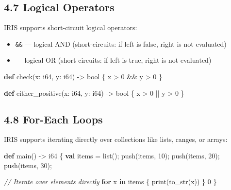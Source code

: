 \documentclass[
  english,
]{book}
\newenvironment{Shaded}{\begin{snugshade}}{\end{snugshade}}
\newcommand{\CommentTok}[1]{\textcolor[rgb]{0.42,0.60,0.33}{\textit{#1}}}
\newcommand{\ControlFlowTok}[1]{\textcolor[rgb]{0.77,0.53,0.75}{\textbf{#1}}}
\newcommand{\DataTypeTok}[1]{\textcolor[rgb]{0.31,0.79,0.69}{#1}}
\newcommand{\DecValTok}[1]{\textcolor[rgb]{0.71,0.81,0.66}{#1}}
\newcommand{\FunctionTok}[1]{\textcolor[rgb]{0.86,0.86,0.67}{#1}}
\newcommand{\KeywordTok}[1]{\textcolor[rgb]{0.34,0.61,0.84}{\textbf{#1}}}
\newcommand{\NormalTok}[1]{\textcolor[rgb]{0.83,0.83,0.83}{#1}}
\newcommand{\OperatorTok}[1]{\textcolor[rgb]{0.83,0.83,0.83}{#1}}
\providecommand{\tightlist}{%
  \setlength{\itemsep}{0pt}\setlength{\parskip}{0pt}}
\begin{document}
\subsection{4.7 Logical Operators}\label{logical-operators}

IRIS supports short-circuit logical operators:

\begin{itemize}
\tightlist
\item
  \texttt{\&\&} --- logical AND (short-circuits: if left is false, right
  is not evaluated)
\item
  \texttt{\textbar{}\textbar{}} --- logical OR (short-circuits: if left
  is true, right is not evaluated)
\end{itemize}

\begin{Shaded}
\begin{Highlighting}[]
\KeywordTok{def}\NormalTok{ check(x: }\DataTypeTok{i64}\NormalTok{, y: }\DataTypeTok{i64}\NormalTok{) }\OperatorTok{{-}\textgreater{}} \DataTypeTok{bool}\NormalTok{ \{}
\NormalTok{    x }\OperatorTok{\textgreater{}} \DecValTok{0} \OperatorTok{\&\&}\NormalTok{ y }\OperatorTok{\textgreater{}} \DecValTok{0}
\NormalTok{\}}

\KeywordTok{def}\NormalTok{ either\_positive(x: }\DataTypeTok{i64}\NormalTok{, y: }\DataTypeTok{i64}\NormalTok{) }\OperatorTok{{-}\textgreater{}} \DataTypeTok{bool}\NormalTok{ \{}
\NormalTok{    x }\OperatorTok{\textgreater{}} \DecValTok{0} \OperatorTok{||}\NormalTok{ y }\OperatorTok{\textgreater{}} \DecValTok{0}
\NormalTok{\}}
\end{Highlighting}
\end{Shaded}

\subsection{4.8 For-Each Loops}\label{for-each-loops}

IRIS supports iterating directly over collections like lists, ranges, or
arrays:

\begin{Shaded}
\begin{Highlighting}[]
\KeywordTok{def}\NormalTok{ main() }\OperatorTok{{-}\textgreater{}} \DataTypeTok{i64}\NormalTok{ \{}
    \KeywordTok{val}\NormalTok{ items }\OperatorTok{=} \DataTypeTok{list}\NormalTok{();}
    \FunctionTok{push}\NormalTok{(items, }\DecValTok{10}\NormalTok{); }\FunctionTok{push}\NormalTok{(items, }\DecValTok{20}\NormalTok{); }\FunctionTok{push}\NormalTok{(items, }\DecValTok{30}\NormalTok{);}
    
    \CommentTok{// Iterate over elements directly}
    \ControlFlowTok{for}\NormalTok{ x }\ControlFlowTok{in}\NormalTok{ items \{}
        \FunctionTok{print}\NormalTok{(}\FunctionTok{to\_str}\NormalTok{(x))}
\NormalTok{    \}}
    \DecValTok{0}
\NormalTok{\}}
\end{Highlighting}
\end{Shaded}
\end{document}

